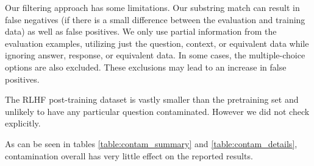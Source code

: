 \documentclass{article}
\begin{document}
Our filtering approach has some limitations. Our substring match can result in false negatives (if there is a small difference between the evaluation and training data) as well as false positives. We only use partial information from the evaluation examples, utilizing just the question, context, or equivalent data while ignoring answer, response, or equivalent data. In some cases, the multiple-choice options are also excluded. These exclusions may lead to an increase in false positives.

The RLHF post-training dataset is vastly smaller than the pretraining set and unlikely to have any particular question contaminated. However we did not check explicitly.

As can be seen in tables \ref{table:contam_summary} and \ref{table:contam_details}, contamination overall has very little effect on the reported results.
\end{document}
